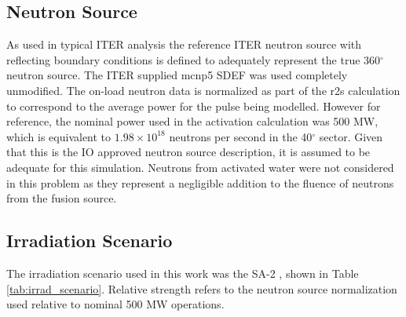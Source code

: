\documentclass[12pt]{article}
\begin{document}
\subsection{Neutron Source}
As used in typical ITER analysis the reference ITER neutron source 
\cite{iter_n_src} with
reflecting boundary conditions is defined to adequately represent the
true 360$^{\circ}$ neutron source. The ITER supplied \gls{mcnp5} SDEF was used
completely unmodified. The on-load neutron data is normalized as part of the 
\gls{r2s} calculation to correspond to the 
average power for the pulse being modelled. However for reference,
the nominal power used in the activation calculation was 500 MW, which is
equivalent to $1.98 \times 10^{18}$ neutrons per second in the 40$^{\circ}$
sector. Given that this is the IO approved neutron source description, it is
assumed to be adequate for this simulation.  Neutrons from activated water
were not considered in this problem as they represent a negligible addition
to the fluence of neutrons from the fusion source.

\subsection{Irradiation Scenario}
The irradiation scenario used in this work was the SA-2 \cite{sa2_irradiation}, 
shown in Table \ref{tab:irrad_scenario}. Relative strength refers to the 
neutron source normalization used relative to nominal 500 MW operations.
\end{document}
